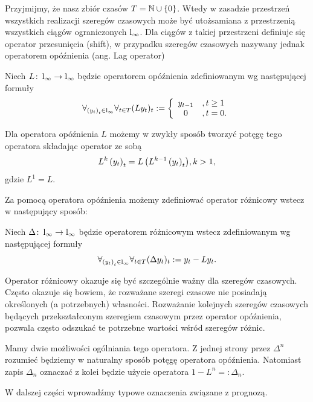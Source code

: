 \documentclass[10pt,a4paper]{book}
\begin{document}
Przyjmijmy, że nasz zbiór czasów $T = \mathbb{N} \cup \left\lbrace {0} \right\rbrace$. Wtedy w zasadzie przestrzeń wszystkich realizacji szeregów czasowych może być utożsamiana z przestrzenią wszystkich ciągów ograniczonych $\operatorname{l}_{\infty} $. Dla ciągów z takiej przestrzeni definiuje się operator przesunięcia (shift), w przypadku szeregów czasowych nazywany jednak operatorem opóźnienia (ang. Lag operator)

\begin{definition} 
Niech $L \colon \operatorname{l}_{\infty} \to \operatorname{l}_{\infty} $ będzie operatorem opóźnienia zdefiniowanym wg następującej formuły
$$
\forall_{\left( {y_t} \right)_{t}^{} \in \operatorname{l}_{\infty} }  \forall_{t \in T} (L y_t)_t := 
\left\lbrace \begin{array}{cl}
y_{t-1} &, t \geq 1\\
0&, t =0.
\end{array} \right. 
$$
\end{definition}

Dla operatora opóźnienia $L$ możemy w zwykły sposób tworzyć potęgę tego operatora składając operator ze sobą
$$
L^k \left( {y_t} \right)_{t}^{}  = {{L}\left( { L^{k-1} \left( {y_t} \right)_{t}^{} } \right)} , k > 1,
$$
gdzie $L^1 = L$.

Za pomocą operatora opóźnienia możemy zdefiniować operator różnicowy wstecz w następujący sposób:
\begin{definition} 
Niech $\Delta \colon \operatorname{l}_{\infty} \to \operatorname{l}_{\infty}$ będzie operatorem różnicowym wstecz zdefiniowanym wg następującej formuły
$$
\forall_{ \left( {y_t} \right)_{t}^{} \in \operatorname{l}_{\infty} } \forall_{t \in T} (\Delta y_t)_t := y_t - L y_t.
$$
\end{definition}

Operator różnicowy okazuje się być szczególnie ważny dla szeregów czasowych. Często okazuje się bowiem, że rozważane szeregi czasowe nie posiadają określonych (a potrzebnych) własności. Rozważanie kolejnych szeregów czasowych będących przekształconym szeregiem czasowym przez operator opóźnienia, pozwala często odszukać te potrzebne wartości wśród szeregów różnic.

Mamy dwie możliwości ogólniania tego operatora. Z jednej strony przez $\Delta^n$ rozumieć będziemy w naturalny sposób potęgę operatora opóźnienia. Natomiast zapis $\Delta_n$ oznaczać z kolei będzie użycie operatora $1 - L^n =: \Delta_n$.

W dalszej części wprowadźmy typowe oznaczenia związane z prognozą.
\end{document}
